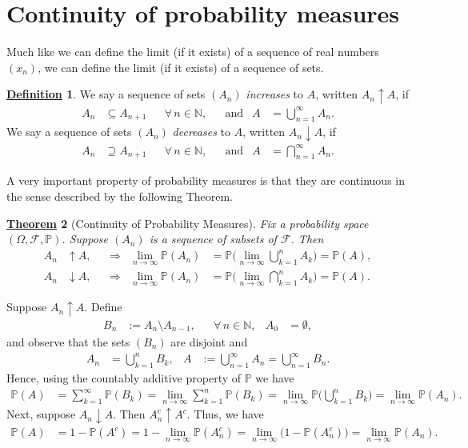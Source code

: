 \documentclass[12pt]{book}
\numberwithin{equation}{chapter}
\theoremstyle{plain}
\newtheorem{theorem}{\underline{Theorem}}
\numberwithin{theorem}{section}
\theoremstyle{definition}
\newtheorem{definition}[theorem]{\underline{Definition}}
\numberwithin{exercise}{chapter}
\let\oldendproof\endproof
\renewenvironment{proof}[1][\proofname]{%
  \oldproof[\scshape\underline{#1}]%
}{\oldendproof}
\newcommand{\<}{\langle}
\renewcommand{\>}{\rangle}
\renewcommand{\(}{\left(}
\renewcommand{\)}{\right)}
\renewcommand{\[}{\left[}
\renewcommand{\]}{\right]}
\newcommand\Pb{\mathds{P}}
\newcommand\Nb{\mathds{N}}
\newcommand\Fc{\mathscr{F}}
\newcommand\Om{\Omega}
\begin{document}
\section{Continuity of probability measures}
\label{sec:continuity.P}
Much like we can define the limit (if it exists) of a sequence of real numbers $(x_n)$, we can define the limit (if it exists) of a sequence of sets.

\begin{definition}
We say a sequence of sets $(A_n)$ \emph{increases} to $A$, written $A_n \uparrow A$, if
\begin{align}
A_n 
	&\subseteq A_{n+1} &
	&\forall \, n \in \Nb , &
	&\text{and}&
A
	&=	\bigcup_{n=1}^\infty A_n .
\end{align}
We say a sequence of sets $(A_n)$ \emph{decreases} to $A$, written $A_n \downarrow A$, if
\begin{align}
A_n 
	&\supseteq A_{n+1} &
	&\forall \, n \in \Nb , &
	&\text{and}&
A
	&=	\bigcap_{n=1}^\infty A_n .
\end{align}
\end{definition}

\noindent
A very important property of probability measures is that they are continuous in the sense described by the following Theorem.

\begin{theorem}[Continuity of Probability Measures]
Fix a probability space $(\Om,\Fc,\Pb)$.
Suppose $(A_n)$ is a sequence of subsets of $\Fc$.  Then
\begin{align}
A_n
	&\uparrow A , &
	&\Rightarrow&
\lim_{n \to \infty} \Pb(A_n)
	&=	\Pb \big( \lim_{n \to \infty} \bigcup_{k=1}^n A_k \big) = \Pb(A) , \\
A_n
	&\downarrow A , &
	&\Rightarrow&
\lim_{n \to \infty} \Pb(A_n)
	&=	\Pb \big( \lim_{n \to \infty} \bigcap_{k=1}^n A_k \big) = \Pb(A) .
\end{align}
\end{theorem}

\begin{proof}
Suppose $A_n \uparrow A$.  Define
\begin{align}
B_n
	&:=	A_n \setminus A_{n-1} , &
	&\forall \, n \in \Nb , &
A_0
	&= \emptyset ,
\end{align}
and observe that the sets $(B_n)$ are disjoint and
\begin{align}
A_n
	&=	\bigcup_{k=1}^n B_k , &
A
	&:=	\bigcup_{n=1}^\infty A_n = \bigcup_{n=1}^\infty B_n .
\end{align}
Hence, using the countably additive property of $\Pb$ we have
\begin{align}
\Pb(A)
	&=	\sum_{k=1}^\infty \Pb(B_k)
	=		\lim_{n \to \infty} \sum_{k=1}^n \Pb(B_k)
	=	\lim_{n \to \infty} \Pb \big( \bigcup_{k=1}^n B_k \big)
	=	\lim_{n \to \infty} \Pb ( A_n ) .
\end{align}
Next, suppose $A_n \downarrow A$.  Then $A_n^c \uparrow A^c$.  Thus, we have
\begin{align}
\Pb(A)
	&=	1-\Pb(A^c) 
	=		1- \lim_{n \to \infty} \Pb ( A_n^c ) 
	=		\lim_{n \to \infty} \big( 1 - \Pb ( A_n^c ) \big)
	=		\lim_{n \to \infty} \Pb ( A_n ) .
\end{align}
\end{proof}
\end{document}
